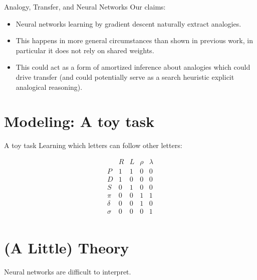 \documentclass{beamer}
\begin{document}
\begin{frame}{Analogy, Transfer, and Neural Networks}
Our claims:
\begin{itemize}
    \item<1-> Neural networks learning by gradient descent naturally extract analogies. 
    \item<2-> This happens in more general circumstances than shown in previous work, in particular it does not rely on shared weights.
    \item<3-> This could act as a form of amortized inference about analogies which could drive transfer (and could potentially serve as a search heuristic explicit analogical reasoning).
\end{itemize}
\end{frame}

\section{Modeling: A toy task}
\begin{frame}{A toy task}
Learning which letters can follow other letters:\vspace{-2em}
\begin{center}
\[
\begin{array}{c|cccc} 
& R & L & \rho & \lambda \\
\hline
P & 1 & 1 & 0 & 0 \\ 
D & 1 & 0 & 0 & 0 \\
S & 0 & 1 & 0 & 0 \\
\pi    & 0 & 0 & 1 & 1 \\ 
\delta & 0 & 0 & 1 & 0 \\
\sigma & 0 & 0 & 0 & 1 \\
\end{array} 
\]
\end{center}
\end{frame}

\section{(A Little) Theory}
\begin{frame}
Neural networks are difficult to interpret.
\end{frame}
\end{document}
